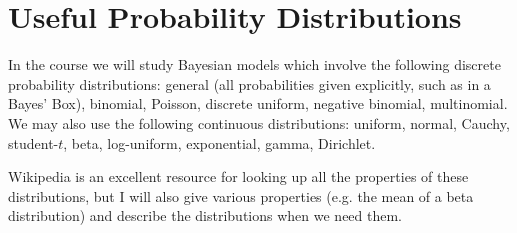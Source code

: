 \section{Useful Probability Distributions}
In the course we will study Bayesian models which involve the following
discrete probability distributions: general (all probabilities given explicitly,
such as in a Bayes' Box), binomial, Poisson, discrete uniform,
negative binomial, multinomial.
We may also use the following continuous distributions: uniform, normal,
Cauchy, student-$t$, beta, log-uniform, exponential, gamma, Dirichlet.

Wikipedia is an excellent resource for looking up all the properties of these
distributions, but I will also give various properties (e.g. the mean of a beta
distribution) and describe the distributions when we need them.

